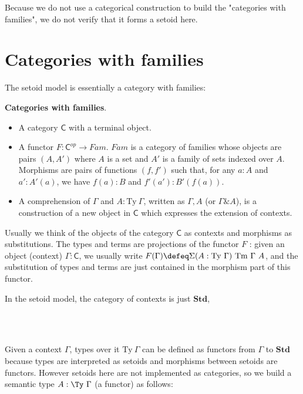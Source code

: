Because we do not use a categorical construction to build the "categories with families", we do not verify that it forms a setoid here. 

\section{Categories with families}

The setoid model is essentially a category with families:

\begin{definition}\label{cwf:def}
\textbf{Categories with families}.

\begin{itemize}
\item A category $\mathsf{C}$ with a terminal object.

\item A functor $F : \mathsf{C}^{op} \to Fam$. $Fam$ is a category of families whose objects are pairs $(A,A')$ where $A$ is a set and $A'$ is a family of sets indexed over $A$. 
Morphisms are pairs of functions $(f,f')$ such that, for any $a : A$ and $a' : A'(a)$, we have $f(a) : B$ and $f'(a') : B'(f(a))$.

\item A comprehension of $\Gamma$ and $A : \text{Ty}~ \Gamma$, written as $\Gamma, A$ (or  $\Gamma \& A$), is a construction of a new object in $\mathsf{C}$ which expresses the extension of contexts.
\end{itemize}

\end{definition}

Usually we think of the objects of the category $\mathsf{C}$ as contexts and morphisms as substitutions. The types and terms are projections of the functor $F$ : given an object (context) $\Gamma : \mathsf{C}$, we usually write $F(\Gamma) \defeq \Sigma(A : \text{Ty} ~\Gamma) ~ \text{Tm} ~\Gamma ~ A$, and the substitution of types and terms are just contained in the morphism part of this functor. 


In the setoid model, the category of contexts is just $\textbf{Std}$,

\begin{code}
%
\\
\> \AgdaSymbol{=} \<%
\\
\end{code}

Given a context $\Gamma$, types over it $\text{Ty}~ \Gamma$ can be defined as functors from $\Gamma$ to $\textbf{Std}$ because types are interpreted as setoids and morphisms between setoids are functors. However setoids here are not implemented as categories, so we build a semantic type $A : \Ty ~\Gamma$ (a functor) as follows:

